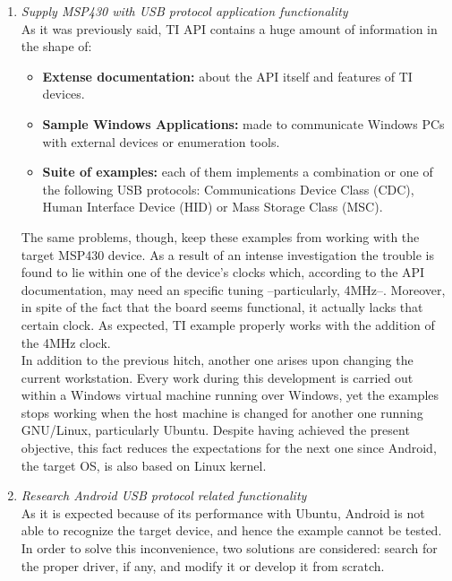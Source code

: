 		\begin{enumerate}
			\item \emph{Supply MSP430 with USB protocol application functionality}\\
				As it was previously said, TI API contains a huge amount of information in the shape of:
				\begin{itemize}
					\item \textbf{Extense documentation:} about the API itself and features of TI devices. 
					\item \textbf{Sample Windows Applications:} made to communicate Windows PCs with external
						devices or enumeration tools.
					\item \textbf{Suite of examples:} each of them implements a combination or one of the
						following USB protocols: Communications Device Class (CDC), Human Interface Device (HID)
						or Mass Storage Class (MSC).
				\end{itemize}
				
				The same problems, though, keep these examples from working with the target MSP430 device. As a
				result of an intense investigation the trouble is found to lie within one of the device's clocks
				which, according to the API documentation, may need an specific tuning --particularly, 4MHz--.
				Moreover, in spite of the fact that the board seems functional, it actually lacks that certain
				clock. As expected, TI example properly works with the addition of the 4MHz clock.\\
				
				In addition to the previous hitch, another one arises upon changing the current workstation.
				Every work during this development is carried out within a Windows virtual machine running over
				Windows, yet the examples stops working when the host machine is changed for another one running
				GNU/Linux, particularly Ubuntu. Despite having achieved the present objective, this fact reduces
				the expectations for the next one since Android, the target OS, is also based on Linux kernel.\\
				
			\item \emph{Research Android USB protocol related functionality}\\
				As it is expected because of its performance with Ubuntu, Android is not able to recognize the
				target device, and hence the example cannot be tested. In order to solve this inconvenience, two
				solutions are considered: search for the proper driver, if any, and modify it or develop
				it from scratch.\\
				

\end{enumerate}
